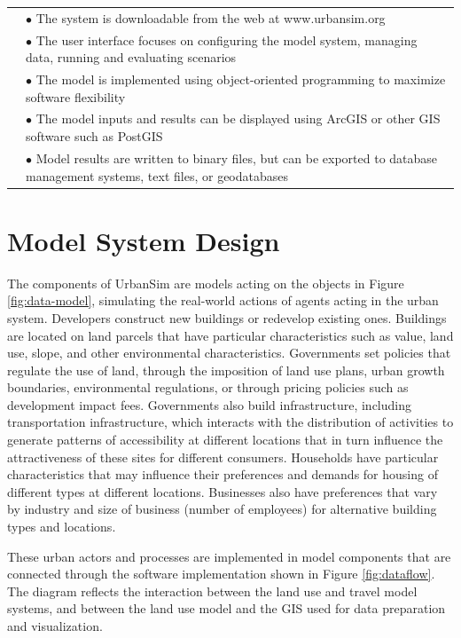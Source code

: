 \begin{table}[htp]
\begin{center}
\begin{tabular}{ p{1.5in}  p{4.4in}  }
& $\bullet$  The system is downloadable from the web at www.urbansim.org\\
&  $\bullet$   The user interface focuses on configuring the model system, managing data, running and evaluating scenarios\\
& $\bullet$    The model is implemented using object-oriented programming to maximize software flexibility\\
&  $\bullet$   The model inputs and results can be displayed using ArcGIS or other GIS software such as PostGIS\\
&  $\bullet$   Model results are written to binary files, but can be exported to database management systems, text files, or geodatabases\\
\bottomrule
\end{tabular}
\end{center}
\end{table}

\section{Model System Design}

The components of UrbanSim are models acting on the objects in Figure
\ref{fig:data-model}, simulating the real-world actions of agents acting in the urban system.  Developers construct new buildings or redevelop existing ones.  Buildings are located on land parcels that have particular characteristics such as value, land use, slope, and other environmental characteristics.  Governments set policies that regulate the use of land, through the imposition of land use plans, urban growth boundaries, environmental regulations, or through pricing policies such as development impact fees.  Governments also build infrastructure, including transportation infrastructure, which interacts with the distribution of activities to generate patterns of accessibility at different locations that in turn influence the attractiveness of these sites for different consumers.  Households have particular characteristics that may influence their preferences and demands for housing of different types at different locations.  Businesses also have preferences that vary by industry and size of business (number of employees) for alternative building types and locations.

These urban actors and processes are implemented in model components that are connected through the software implementation shown in Figure \ref{fig:dataflow}. The diagram reflects the interaction between the land use and travel model systems, and between the land use model and the GIS used for data preparation and visualization.

